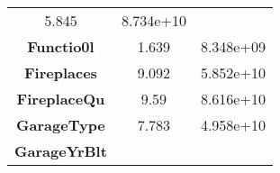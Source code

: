 \documentclass[]{article}
\begin{document}
\begin{longtable}[c]{@{}ccc@{}}
\begin{minipage}[t]{0.16\columnwidth}
5.845
\strut\end{minipage} &
\begin{minipage}[t]{0.19\columnwidth}\centering\strut
8.734e+10
\strut\end{minipage}\tabularnewline
\begin{minipage}[t]{0.25\columnwidth}\centering\strut
\textbf{Functio0l}
\strut\end{minipage} &
\begin{minipage}[t]{0.16\columnwidth}\centering\strut
1.639
\strut\end{minipage} &
\begin{minipage}[t]{0.19\columnwidth}\centering\strut
8.348e+09
\strut\end{minipage}\tabularnewline
\begin{minipage}[t]{0.25\columnwidth}\centering\strut
\textbf{Fireplaces}
\strut\end{minipage} &
\begin{minipage}[t]{0.16\columnwidth}\centering\strut
9.092
\strut\end{minipage} &
\begin{minipage}[t]{0.19\columnwidth}\centering\strut
5.852e+10
\strut\end{minipage}\tabularnewline
\begin{minipage}[t]{0.25\columnwidth}\centering\strut
\textbf{FireplaceQu}
\strut\end{minipage} &
\begin{minipage}[t]{0.16\columnwidth}\centering\strut
9.59
\strut\end{minipage} &
\begin{minipage}[t]{0.19\columnwidth}\centering\strut
8.616e+10
\strut\end{minipage}\tabularnewline
\begin{minipage}[t]{0.25\columnwidth}\centering\strut
\textbf{GarageType}
\strut\end{minipage} &
\begin{minipage}[t]{0.16\columnwidth}\centering\strut
7.783
\strut\end{minipage} &
\begin{minipage}[t]{0.19\columnwidth}\centering\strut
4.958e+10
\strut\end{minipage}\tabularnewline
\begin{minipage}[t]{0.25\columnwidth}\centering\strut
\textbf{GarageYrBlt}
\strut\end{minipage} &
\begin{minipage}[t]{0.16\columnwidth}\centering\strut

\end{minipage}
\end{longtable}
\end{document}
